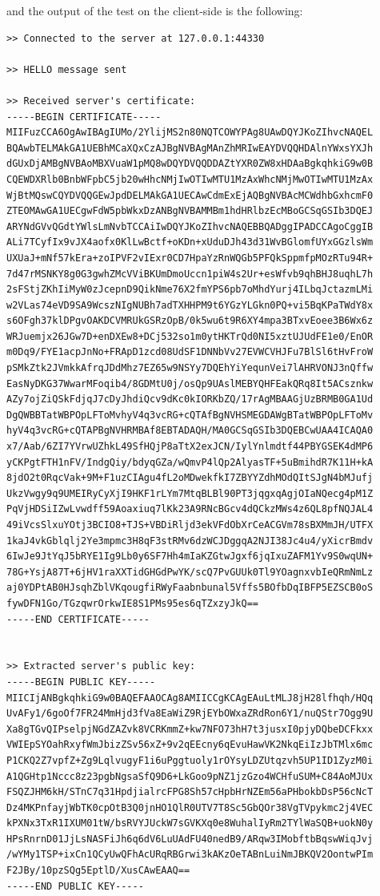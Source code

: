 and the output of the test on the client-side is the following:
\begin{verbatim}
>> Connected to the server at 127.0.0.1:44330

>> HELLO message sent

>> Received server's certificate:
-----BEGIN CERTIFICATE-----
MIIFuzCCA6OgAwIBAgIUMo/2YlijMS2n80NQTCOWYPAg8UAwDQYJKoZIhvcNAQEL
BQAwbTELMAkGA1UEBhMCaXQxCzAJBgNVBAgMAnZhMRIwEAYDVQQHDAlnYWxsYXJh
dGUxDjAMBgNVBAoMBXVuaW1pMQ8wDQYDVQQDDAZtYXR0ZW8xHDAaBgkqhkiG9w0B
CQEWDXRlb0BnbWFpbC5jb20wHhcNMjIwOTIwMTU1MzAxWhcNMjMwOTIwMTU1MzAx
WjBtMQswCQYDVQQGEwJpdDELMAkGA1UECAwCdmExEjAQBgNVBAcMCWdhbGxhcmF0
ZTEOMAwGA1UECgwFdW5pbWkxDzANBgNVBAMMBm1hdHRlbzEcMBoGCSqGSIb3DQEJ
ARYNdGVvQGdtYWlsLmNvbTCCAiIwDQYJKoZIhvcNAQEBBQADggIPADCCAgoCggIB
ALi7TCyfIx9vJX4aofx0KlLwBctf+oKDn+xUduDJh43d31WvBGlomfUYxGGzlsWm
UXUaJ+mNf57kEra+zoIPVF2vIExr0CD7HpaYzRnWQGb5PFQkSppmfpMOzRTu94R+
7d47rMSNKY8g0G3gwhZMcVViBKUmDmoUccn1piW4s2Ur+esWfvb9qhBHJ8uqhL7h
2sFStjZKhIiMyW0zJcepnD9QikNme76X2fmYPS6pb7oMhdYurj4ILbqJctazmLMi
w2VLas74eVD9SA9WcszNIgNUBh7adTXHHPM9t6YGzYLGkn0PQ+vi5BqKPaTWdY8x
s6OFgh37klDPgvOAKDCVMRUkGSRzOpB/0k5wu6t9R6XY4mpa3BTxvEoee3B6Wx6z
WRJuemjx26JGw7D+enDXEw8+DCj532so1m0ytHKTrQd0NI5xztUJUdFE1e0/EnOR
m0Dq9/FYE1acpJnNo+FRApD1zcd08UdSF1DNNbVv27EVWCVHJFu7BlSl6tHvFroW
pSMkZtk2JVmkkAfrqJDdMhz7EZ65w9NSYy7DQEhYiYequnVei7lAHRVONJ3nQffw
EasNyDKG37WwarMFoqib4/8GDMtU0j/osQp9UAslMEBYQHFEakQRq8It5ACsznkw
AZy7ojZiQSkFdjqJ7cDyJhdiQcv9dKc0kIORKbZQ/17rAgMBAAGjUzBRMB0GA1Ud
DgQWBBTatWBPOpLFToMvhyV4q3vcRG+cQTAfBgNVHSMEGDAWgBTatWBPOpLFToMv
hyV4q3vcRG+cQTAPBgNVHRMBAf8EBTADAQH/MA0GCSqGSIb3DQEBCwUAA4ICAQA0
x7/Aab/6ZI7YVrwUZhkL49SfHQjP8aTtX2exJCN/IylYnlmdtf44PBYGSEK4dMP6
yCKPgtFTH1nFV/IndgQiy/bdyqGZa/wQmvP4lQp2AlyasTF+5uBmihdR7K11H+kA
8jdO2t0RqcVak+9M+F1uzCIAgu4fL2oMDwekfkI7ZBYYZdhMOdQItSJgN4bMJufj
UkzVwgy9q9UMEIRyCyXjI9HKF1rLYm7MtqBLBl90PT3jqgxqAgjOIaNQecg4pM1Z
PqVjHDSiIZwLvwdff59Aoaxiuq7lKk23A9RNcBGcv4dQCkzMWs4z6QL8pfNQJAL4
49iVcsSlxuYOtj3BCIO8+TJS+VBDiRljd3ekVFdObXrCeACGVm78sBXMmJH/UTFX
1kaJ4vkGblqlj2Ye3mpmc3H8qF3stRMv6dzWCJDggqA2NJI38Jc4u4/yXicrBmdv
6IwJe9JtYqJ5bRYE1Ig9Lb0y6SF7Hh4mIaKZGtwJgxf6jqIxuZAFM1Yv9S0wqUN+
78G+YsjA87T+6jHV1raXXTidGHGdPwYK/scQ7PvGUUk0Tl9YOagnxvbIeQRmNmLz
aj0YDPtAB0HJsqhZblVKqougfiRWyFaabnbunal5Vffs5BOfbDqIBFP5EZSCB0oS
fywDFN1Go/TGzqwrOrkwIE8S1PMs95es6qTZxzyJkQ==
-----END CERTIFICATE-----


>> Extracted server's public key:
-----BEGIN PUBLIC KEY-----
MIICIjANBgkqhkiG9w0BAQEFAAOCAg8AMIICCgKCAgEAuLtMLJ8jH28lfhqh/HQq
UvAFy1/6goOf7FR24MmHjd3fVa8EaWiZ9RjEYbOWxaZRdRon6Y1/nuQStr7Ogg9U
Xa8gTGvQIPselpjNGdZAZvk8VCRKmmZ+kw7NFO73hH7t3jusxI0pjyDQbeDCFkxx
VWIEpSYOahRxyfWmJbizZSv56xZ+9v2qEEcny6qEvuHawVK2NkqEiIzJbTMlx6mc
P1CKQ2Z7vpfZ+Zg9LqlvugyF1i6uPggtuoly1rOYsyLDZUtqzvh5UP1ID1ZyzM0i
A1QGHtp1Nccc8z23pgbNgsaSfQ9D6+LkGoo9pNZ1jzGzo4WCHfuSUM+C84AoMJUx
FSQZJHM6kH/STnC7q31HpdjialrcFPG8Sh57cHpbHrNZEm56aPHbokbDsP56cNcT
Dz4MKPnfayjWbTK0cpOtB3Q0jnHO1QlR0UTV7T8Sc5GbQOr38VgTVpykmc2j4VEC
kPXNx3TxR1IXUM01tW/bsRVYJUckW7sGVKXq0e8WuhalIyRm2TYlWaSQB+uokN0y
HPsRnrnD01JjLsNASFiJh6q6dV6LuUAdFU40nedB9/ARqw3IMobftbBqswWiqJvj
/wYMy1TSP+ixCn1QCyUwQFhAcURqRBGrwi3kAKzOeTABnLuiNmJBKQV2OontwPIm
F2JBy/10pzSQg5EptlD/XusCAwEAAQ==
-----END PUBLIC KEY-----



\end{verbatim}
